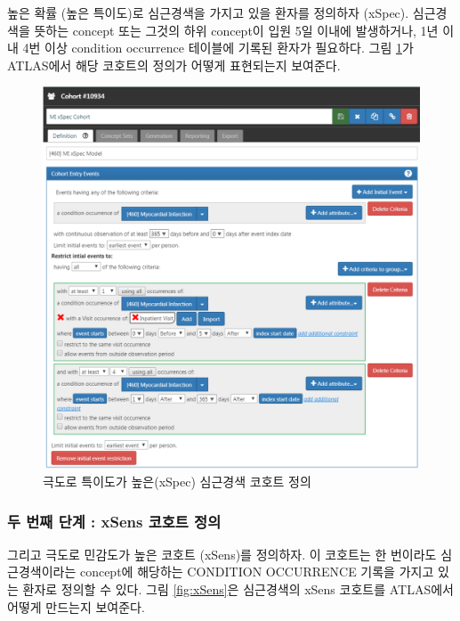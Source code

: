 \documentclass[10.5pt]{book}
\theoremstyle{definition}
\theoremstyle{definition}
\theoremstyle{definition}
\theoremstyle{remark}
\begin{document}
높은 확률 (높은 특이도)로 심근경색을 가지고 있을 환자를 정의하자
(xSpec). 심근경색을 뜻하는 concept 또는 그것의 하위 concept이 입원 5일
이내에 발생하거나, 1년 이내 4번 이상 condition occurrence 테이블에
기록된 환자가 필요하다. 그림 \ref{fig:xSpec}가 ATLAS에서 해당 코호트의
정의가 어떻게 표현되는지 보여준다. 

\begin{figure}

{\centering \includegraphics[width=1\linewidth]{images/ClinicalValidity/xSpec} 

}

\caption{극도로 특이도가 높은(xSpec) 심근경색 코호트 정의}\label{fig:xSpec}
\end{figure}

\subsubsection*{두 번째 단계 : xSens 코호트 정의}\label{---xsens--}

그리고 극도로 민감도가 높은 코호트 (xSens)를 정의하자. 이 코호트는 한
번이라도 심근경색이라는 concept에 해당하는 CONDITION OCCURRENCE 기록을
가지고 있는 환자로 정의할 수 있다. 그림 \ref{fig:xSens}은 심근경색의
xSens 코호트를 ATLAS에서 어떻게 만드는지 보여준다. 
\end{document}
